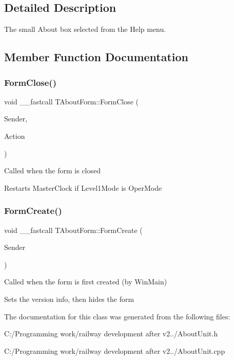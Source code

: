 \subsection{Detailed Description}
The small \textquotesingle{}About\textquotesingle{} box selected from the Help menu. 

\subsection{Member Function Documentation}
\mbox{\label{class_t_about_form_acddaba886282fa0cb6aa0ee77520fb05}} 
\subsubsection{\texorpdfstring{Form\+Close()}{FormClose()}}
{\footnotesize\ttfamily void \+\_\+\+\_\+fastcall T\+About\+Form\+::\+Form\+Close (\begin{DoxyParamCaption}\item[{T\+Object $\ast$}]{Sender,  }\item[{T\+Close\+Action \&}]{Action }\end{DoxyParamCaption})}

Called when the form is closed

Restarts Master\+Clock if Level1\+Mode is Oper\+Mode \mbox{\label{class_t_about_form_ad2cb3d318c91018ed8986c8315ccd52b}} 
\subsubsection{\texorpdfstring{Form\+Create()}{FormCreate()}}
{\footnotesize\ttfamily void \+\_\+\+\_\+fastcall T\+About\+Form\+::\+Form\+Create (\begin{DoxyParamCaption}\item[{T\+Object $\ast$}]{Sender }\end{DoxyParamCaption})}

Called when the form is first created (by Win\+Main)

Sets the version info, then hides the form 

The documentation for this class was generated from the following files\+:\begin{DoxyCompactItemize}
\item 
C\+:/\+Programming work/railway development after v2../About\+Unit.\+h\item 
C\+:/\+Programming work/railway development after v2../About\+Unit.\+cpp\end{DoxyCompactItemize}
